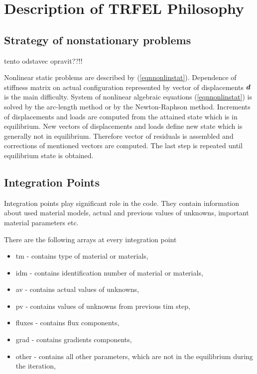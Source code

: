 \chapter{Description of TRFEL Philosophy}

\section{Strategy of nonstationary problems}

tento odstavec opravit??!!

Nonlinear static problems are described by (\ref{eqnnonlinstat}). Dependence of stiffness matrix on actual
configuration represented by vector of displacements $\mbox{\boldmath$d$}$ is the main difficulty. System of nonlinear
algebraic equations (\ref{eqnnonlinstat}) is solved by the arc-length method or by the Newton-Raphson method.
Increments of displacements and loads are computed from the attained state which is in equilibrium. New
vectors of displacements and loads define new state which is generally not in equilibrium. Therefore vector
of residuals is assembled and corrections of mentioned vectors are computed. The last step is repeated until
equilibrium state is obtained.


\section{Integration Points}

Integration points play significant role in the code. They contain information about used material models,
actual and previous values of unknowns, important material parameters etc.


There are the following arrays at every integration point
\begin{itemize}
\item{{\sf tm} - contains type of material or materials,}
\item{{\sf idm} - contains identification number of material or materials,}
\item{{\sf av} - contains actual values of unknowns,}
\item{{\sf pv} - contains values of unknowns from previous tim step,}
\item{{\sf fluxes} - contains flux components,}
\item{{\sf grad} - contains gradients components,}
\item{{\sf other} - contains all other parameters, which are not in the equilibrium during the iteration,}
\end{itemize}

